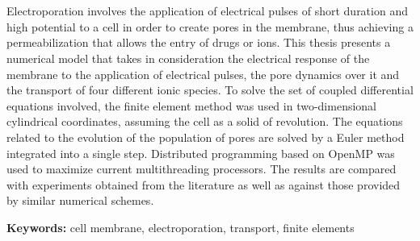 \chapter*{\runtitle}

\noindent 

Electroporation involves the application of electrical pulses of short duration and high potential to a cell in order to create pores in the membrane, thus achieving a permeabilization that allows the entry of drugs or ions. This thesis presents a numerical model that takes in consideration the electrical response of the membrane to the application of electrical pulses, the pore dynamics over it and the transport of four different ionic species. To solve the set of coupled differential equations involved, the finite element method was used in two-dimensional cylindrical coordinates, assuming the cell as a solid of revolution. The equations related to the evolution of the population of pores are solved by a Euler method integrated into a single step. Distributed programming based on OpenMP was used to maximize current multithreading processors. The results are compared with experiments obtained from the literature as well as against those provided by similar numerical schemes.

\bigskip

\noindent\textbf{Keywords:} cell membrane, electroporation, transport, finite elements